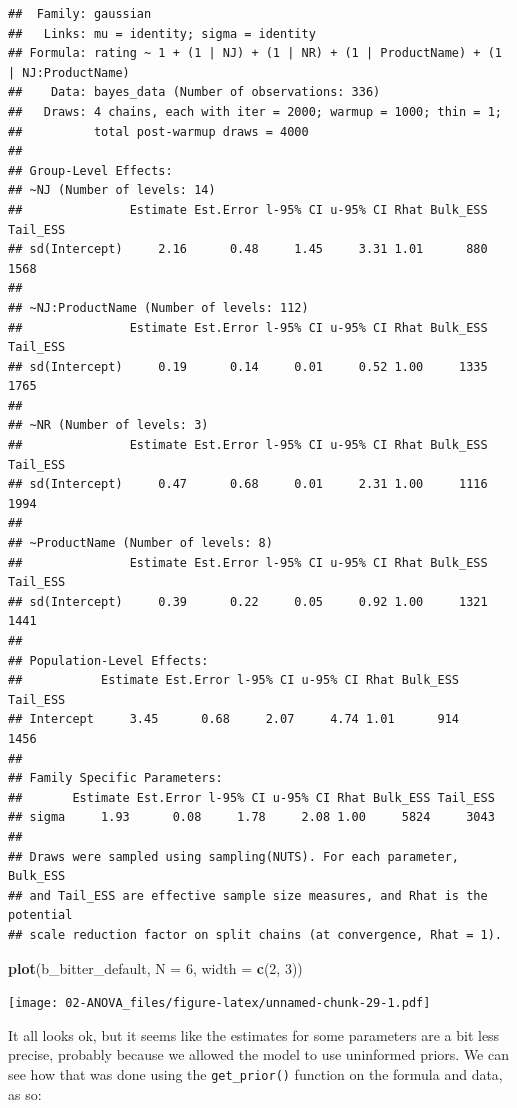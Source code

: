\documentclass[
]{book}
\newenvironment{Shaded}{\begin{snugshade}}{\end{snugshade}}
\newcommand{\AttributeTok}[1]{\textcolor[rgb]{0.13,0.29,0.53}{#1}}
\newcommand{\DecValTok}[1]{\textcolor[rgb]{0.00,0.00,0.81}{#1}}
\newcommand{\FunctionTok}[1]{\textcolor[rgb]{0.13,0.29,0.53}{\textbf{#1}}}
\newcommand{\NormalTok}[1]{#1}
\begin{document}
\begin{verbatim}
##  Family: gaussian 
##   Links: mu = identity; sigma = identity 
## Formula: rating ~ 1 + (1 | NJ) + (1 | NR) + (1 | ProductName) + (1 | NJ:ProductName) 
##    Data: bayes_data (Number of observations: 336) 
##   Draws: 4 chains, each with iter = 2000; warmup = 1000; thin = 1;
##          total post-warmup draws = 4000
## 
## Group-Level Effects: 
## ~NJ (Number of levels: 14) 
##               Estimate Est.Error l-95% CI u-95% CI Rhat Bulk_ESS Tail_ESS
## sd(Intercept)     2.16      0.48     1.45     3.31 1.01      880     1568
## 
## ~NJ:ProductName (Number of levels: 112) 
##               Estimate Est.Error l-95% CI u-95% CI Rhat Bulk_ESS Tail_ESS
## sd(Intercept)     0.19      0.14     0.01     0.52 1.00     1335     1765
## 
## ~NR (Number of levels: 3) 
##               Estimate Est.Error l-95% CI u-95% CI Rhat Bulk_ESS Tail_ESS
## sd(Intercept)     0.47      0.68     0.01     2.31 1.00     1116     1994
## 
## ~ProductName (Number of levels: 8) 
##               Estimate Est.Error l-95% CI u-95% CI Rhat Bulk_ESS Tail_ESS
## sd(Intercept)     0.39      0.22     0.05     0.92 1.00     1321     1441
## 
## Population-Level Effects: 
##           Estimate Est.Error l-95% CI u-95% CI Rhat Bulk_ESS Tail_ESS
## Intercept     3.45      0.68     2.07     4.74 1.01      914     1456
## 
## Family Specific Parameters: 
##       Estimate Est.Error l-95% CI u-95% CI Rhat Bulk_ESS Tail_ESS
## sigma     1.93      0.08     1.78     2.08 1.00     5824     3043
## 
## Draws were sampled using sampling(NUTS). For each parameter, Bulk_ESS
## and Tail_ESS are effective sample size measures, and Rhat is the potential
## scale reduction factor on split chains (at convergence, Rhat = 1).
\end{verbatim}

\begin{Shaded}
\begin{Highlighting}[]
\FunctionTok{plot}\NormalTok{(b\_bitter\_default, }\AttributeTok{N =} \DecValTok{6}\NormalTok{, }\AttributeTok{width =} \FunctionTok{c}\NormalTok{(}\DecValTok{2}\NormalTok{, }\DecValTok{3}\NormalTok{))}
\end{Highlighting}
\end{Shaded}

\texttt{[image: 02-ANOVA\_files/figure-latex/unnamed-chunk-29-1.pdf]}

It all looks ok, but it seems like the estimates for some parameters are a bit less precise, probably because we allowed the model to use uninformed priors. We can see how that was done using the \texttt{get\_prior()} function on the formula and data, as so:
\end{document}
